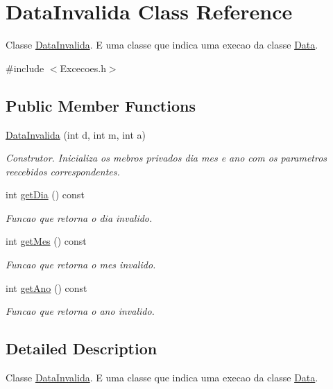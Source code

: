 \hypertarget{class_data_invalida}{}\section{Data\+Invalida Class Reference}
\label{class_data_invalida}


Classe \hyperlink{class_data_invalida}{Data\+Invalida}. E uma classe que indica uma execao da classe \hyperlink{class_data}{Data}.  




{\ttfamily \#include $<$Excecoes.\+h$>$}

\subsection*{Public Member Functions}
\begin{DoxyCompactItemize}
\item 
\hyperlink{class_data_invalida_ab137bea2db6633300269c0d97d1bae69}{Data\+Invalida} (int d, int m, int a)
\begin{DoxyCompactList}\small\item\em Construtor. Inicializa os mebros privados dia mes e ano com os parametros reecebidos correspondentes. \end{DoxyCompactList}\item 
int \hyperlink{class_data_invalida_a3cffc26bb41b7bbddb96c1422d3fe60b}{get\+Dia} () const 
\begin{DoxyCompactList}\small\item\em Funcao que retorna o dia invalido. \end{DoxyCompactList}\item 
int \hyperlink{class_data_invalida_a22f39fe99f467b66d61dc576d750d4c6}{get\+Mes} () const 
\begin{DoxyCompactList}\small\item\em Funcao que retorna o mes invalido. \end{DoxyCompactList}\item 
int \hyperlink{class_data_invalida_afafe67093a501d5d861b8475695f29fe}{get\+Ano} () const 
\begin{DoxyCompactList}\small\item\em Funcao que retorna o ano invalido. \end{DoxyCompactList}\end{DoxyCompactItemize}


\subsection{Detailed Description}
Classe \hyperlink{class_data_invalida}{Data\+Invalida}. E uma classe que indica uma execao da classe \hyperlink{class_data}{Data}. 

